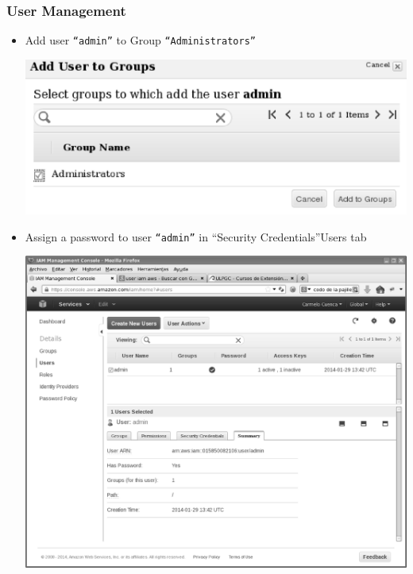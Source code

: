 \documentclass{beamer}
\begin{document}
\begin{frame}[fragile]
\frametitle{User Management}
\begin{itemize}
\item Add user \texttt{``admin''} to Group \texttt{``Administrators''}
\begin{center}
\includegraphics[scale=0.15]{addusertogroup.eps}
\end{center}
\item Assign a password to user \texttt{``admin''} in ``Security Credentials''Users tab
\begin{center}
\includegraphics[scale=0.10]{summary.eps}
\end{center}
\end{itemize}
\end{frame}
\end{document}
